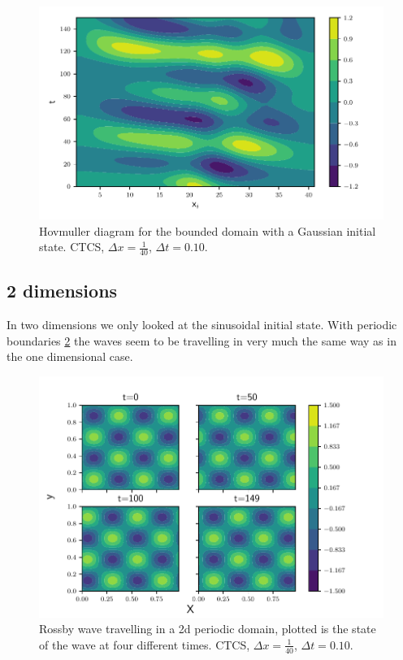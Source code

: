 \begin{figure}[htp]
  \centering
  \includegraphics[width=\textwidth]{../figures/psi_bounded_centered_gauss.pdf}
  \caption{Hovmuller diagram for the bounded domain with a Gaussian initial state. CTCS, $\Delta x = \frac{1}{40}$, $\Delta t = 0.10$.}
  \label{fig:bounded_gauss}
\end{figure}


\subsection{2 dimensions}

In two dimensions we only looked at the sinusoidal initial state.
With periodic boundaries \cref{fig:2d_periodic} the waves seem to be travelling
in very much the same way as in the one dimensional case.


\begin{figure}[htp]
  \centering
  \includegraphics[width=\textwidth]{../figures/periodic_2d.pdf}
  \caption{Rossby wave travelling in a 2d periodic domain, plotted is the state of the wave at four different times. CTCS, $\Delta x = \frac{1}{40}$, $\Delta t = 0.10$.}
  \label{fig:2d_periodic}
\end{figure}



